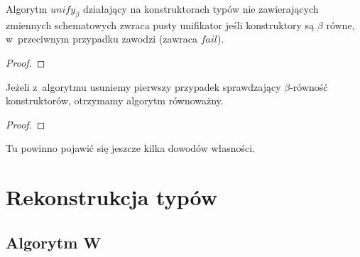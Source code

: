 \documentclass[11pt,leqno]{article}
\begin{document}
\begin{fakt}
Algorytm $unify_\beta$ działający na konstruktorach typów nie zawierających zmiennych schematowych
zwraca pusty unifikator jeśli konstruktory są $\beta$ równe, w~przeciwnym przypadku zawodzi (zawraca $fail$).
\end{fakt}
\begin{proof}
\end{proof}

\begin{fakt}
Jeżeli z~algorytmu usuniemy pierwszy przypadek sprawdzający $\beta$-równość konstruktorów, otrzymamy algorytm
równoważny.
\end{fakt}
\begin{proof}
\end{proof}

Tu powinno pojawić się jeszcze kilka dowodów własności.

\section{Rekonstrukcja typów}

\subsection{Algorytm W}
\end{document}
